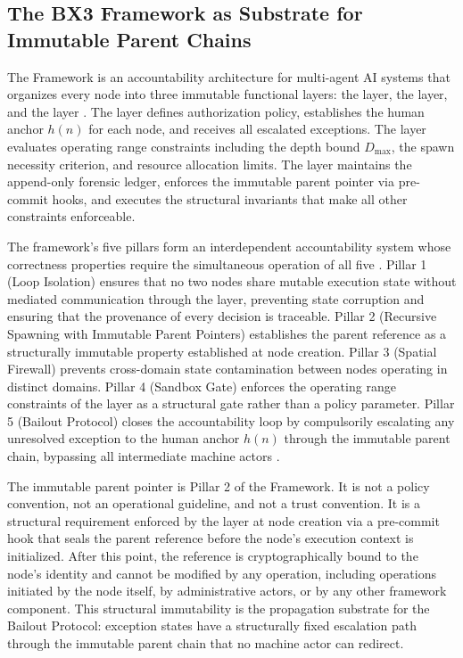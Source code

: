\subsection{The BX3 Framework as Substrate for Immutable Parent Chains}\label{sec:bx3-substrate}

The \bxthree{} Framework is an accountability architecture for multi-agent AI systems that organizes every node into three immutable functional layers: the \purpose{} layer, the \bounds{} layer, and the \fact{} layer \cite{bx3framework}.  The \purpose{} layer defines authorization policy, establishes the human anchor $h(n)$ for each node, and receives all escalated exceptions.  The \bounds{} layer evaluates operating range constraints including the depth bound $D_{\max}$, the spawn necessity criterion, and resource allocation limits.  The \fact{} layer maintains the append-only forensic ledger, enforces the immutable parent pointer via pre-commit hooks, and executes the structural invariants that make all other constraints enforceable.

The framework's five pillars form an interdependent accountability system whose correctness properties require the simultaneous operation of all five \cite{bx3framework}.  Pillar 1 (Loop Isolation) ensures that no two nodes share mutable execution state without mediated communication through the \fact{} layer, preventing state corruption and ensuring that the provenance of every decision is traceable.  Pillar 2 (Recursive Spawning with Immutable Parent Pointers) establishes the parent reference as a structurally immutable property established at node creation.  Pillar 3 (Spatial Firewall) prevents cross-domain state contamination between nodes operating in distinct domains.  Pillar 4 (Sandbox Gate) enforces the operating range constraints of the \bounds{} layer as a structural gate rather than a policy parameter.  Pillar 5 (Bailout Protocol) closes the accountability loop by compulsorily escalating any unresolved exception to the human anchor $h(n)$ through the immutable parent chain, bypassing all intermediate machine actors \cite{bx3framework}.

The immutable parent pointer is Pillar 2 of the \bxthree{} Framework.  It is not a policy convention, not an operational guideline, and not a trust convention.  It is a structural requirement enforced by the \fact{} layer at node creation via a pre-commit hook that seals the parent reference before the node's execution context is initialized.  After this point, the reference is cryptographically bound to the node's identity and cannot be modified by any operation, including operations initiated by the node itself, by administrative actors, or by any other framework component.  This structural immutability is the propagation substrate for the Bailout Protocol: exception states have a structurally fixed escalation path through the immutable parent chain that no machine actor can redirect.

